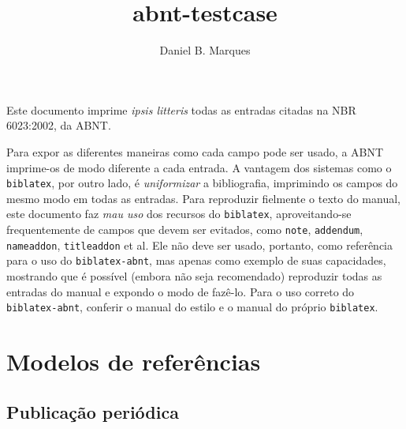 \documentclass[a4paper]{article}
\title{abnt-testcase}
\author{Daniel B. Marques}
\begin{document}
\maketitle

Este documento imprime \textit{ipsis litteris} todas as entradas citadas na NBR
6023:2002, da ABNT.

Para expor as diferentes maneiras como cada campo pode ser usado, a ABNT
imprime-os de modo diferente a cada entrada. A vantagem dos sistemas como
o \texttt{biblatex}, por outro lado, é \emph{uniformizar} a bibliografia,
imprimindo os campos do mesmo modo em todas as entradas. Para reproduzir
fielmente o texto do manual, este documento faz \emph{mau uso} dos recursos do
\texttt{biblatex}, aproveitando-se frequentemente de campos que devem ser
evitados, como \texttt{note}, \texttt{addendum}, \texttt{nameaddon},
\texttt{titleaddon} et al. Ele não deve ser usado, portanto, como referência
para o uso do \texttt{biblatex-abnt}, mas apenas como exemplo de suas
capacidades, mostrando que é possível (embora não seja recomendado) reproduzir
todas as entradas do manual e expondo o modo de fazê-lo. Para o uso correto do
\texttt{biblatex-abnt}, conferir o manual do estilo e o manual do próprio
\texttt{biblatex}.

\tableofcontents

\nocite{*}

\clearpage


\setcounter{section}{6}


\section{Modelos de referências}


	\printbibliography[keyword=7.1, title={Monografia no todo}]

	\printbibliography[keyword=7.2,
    title={Monografia no todo em meio eletrônico}]

	\printbibliography[keyword=7.3, title={Parte de monografia}]

	\printbibliography[keyword=7.4,
    title={Parte de monografia em meio eletrônico}]

	\subsection{Publicação periódica}

	  \printbibliography[heading=subbib, keyword=7.5.1,
      title={Publicação periódica como um todo}]
	  \printbibliography[heading=subbib, keyword=7.5.2,
      title={Partes de revista, boletim etc.}]
	  \printbibliography[heading=subbib, keyword=7.5.3,
      title={Artigo e/ou matéria de revista, boletim etc.}]
	  \printbibliography[heading=subbib, keyword=7.5.4,
      title={Artigo e/ou matéria de revista,
             boletim etc.\ em meio eletrônico}]
	  \printbibliography[heading=subbib, keyword=7.5.5,
      title={Artigo e/ou matéria de jornal}]
\end{document}

